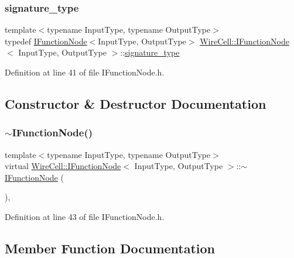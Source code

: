 \subsubsection{\texorpdfstring{signature\+\_\+type}{signature\_type}}
{\footnotesize\ttfamily template$<$typename Input\+Type, typename Output\+Type$>$ \\
typedef \hyperlink{class_wire_cell_1_1_i_function_node}{I\+Function\+Node}$<$Input\+Type, Output\+Type$>$ \hyperlink{class_wire_cell_1_1_i_function_node}{Wire\+Cell\+::\+I\+Function\+Node}$<$ Input\+Type, Output\+Type $>$\+::\hyperlink{class_wire_cell_1_1_i_function_node_a86cc51379625ab1584fd5de9688df262}{signature\+\_\+type}}



Definition at line 41 of file I\+Function\+Node.\+h.



\subsection{Constructor \& Destructor Documentation}
\mbox{\label{class_wire_cell_1_1_i_function_node_aa554f458966305cfcbecfd122e892847}} 
\subsubsection{\texorpdfstring{$\sim$\+I\+Function\+Node()}{~IFunctionNode()}}
{\footnotesize\ttfamily template$<$typename Input\+Type, typename Output\+Type$>$ \\
virtual \hyperlink{class_wire_cell_1_1_i_function_node}{Wire\+Cell\+::\+I\+Function\+Node}$<$ Input\+Type, Output\+Type $>$\+::$\sim$\hyperlink{class_wire_cell_1_1_i_function_node}{I\+Function\+Node} (\begin{DoxyParamCaption}{ }\end{DoxyParamCaption})\hspace{0.3cm}{\ttfamily [inline]}, {\ttfamily [virtual]}}



Definition at line 43 of file I\+Function\+Node.\+h.



\subsection{Member Function Documentation}
\mbox{\label{class_wire_cell_1_1_i_function_node_a19aa126e6b3924b2dbc23625e8ff4a8b}} 
